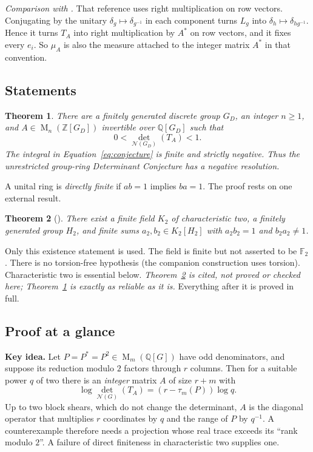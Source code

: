 \documentclass[11pt]{article}
\newtheorem{theorem}{Theorem}[section]
\theoremstyle{remark}
\numberwithin{equation}{section}
\newcommand{\F}{\mathbb F}
\newcommand{\Z}{\mathbb Z}
\newcommand{\Q}{\mathbb Q}
\newcommand{\Mat}{\operatorname{M}}
\newcommand{\N}{\mathcal N}
\begin{document}
\emph{Comparison with \cite{Luck2002}.} That reference uses right multiplication on row vectors. Conjugating by the unitary $\delta_g\mapsto\delta_{g^{-1}}$ in each component turns $L_g$ into $\delta_h\mapsto\delta_{hg^{-1}}$. Hence it turns $T_A$ into right multiplication by $A^*$ on row vectors, and it fixes every $e_i$. So $\mu_A$ is also the measure attached to the integer matrix $A^*$ in that convention.

\subsection*{Statements}

\begin{theorem}\label{thm:main}
There are a finitely generated discrete group $G_D$, an integer
$n\ge1$, and $A\in\Mat_n(\Z[G_D])$ invertible over $\Q[G_D]$ such
that
\[
 0<\det_{\N(G_D)}(T_A)<1.
\]
The integral in Equation~\eqref{eq:conjecture} is finite and strictly
negative. Thus the unrestricted group-ring Determinant Conjecture
has a negative resolution.
\end{theorem}

A unital ring is \emph{directly finite} if $ab=1$ implies $ba=1$. The proof rests on one external result.

\begin{theorem}[{\cite[Theorem 1.1]{CharacteristicTwo}}]
\label{thm:input}
There exist a finite field $K_2$ of characteristic two, a finitely
generated group $H_2$, and finite sums $a_2,b_2\in K_2[H_2]$ with
$a_2b_2=1$ and $b_2a_2\ne1$.
\end{theorem}

Only this existence statement is used. The field is finite but not asserted to be $\F_2$. There is no torsion-free hypothesis (the companion construction uses torsion). Characteristic two is essential below. \emph{Theorem~\ref{thm:input} is cited, not proved or checked here; Theorem~\ref{thm:main} is exactly as reliable as it is.} Everything after it is proved in full.

\subsection*{Proof at a glance}

\textbf{Key idea.} Let $P=P^*=P^2\in\Mat_m(\Q[G])$ have odd denominators, and suppose its reduction modulo $2$ factors through $r$ columns. Then for a suitable power $q$ of two there is an \emph{integer} matrix $A$ of size $r+m$ with
\[
 \log\det_{\N(G)}(T_A)=(r-\tau_m(P))\log q .
\]
Up to two block shears, which do not change the determinant, $A$ is the diagonal operator that multiplies $r$ coordinates by $q$ and the range of $P$ by $q^{-1}$. A counterexample therefore needs a projection whose real trace exceeds its ``rank modulo $2$''. A failure of direct finiteness in characteristic two supplies one.
\end{document}
